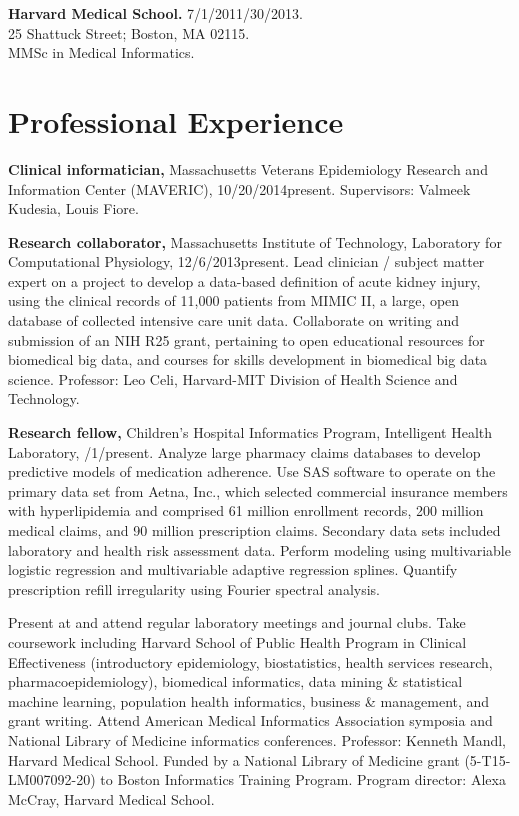 \documentclass[12pt]{article}
\begin{document}
\textbf{Harvard Medical School.} 7/1/2011/30/2013.\\
25 Shattuck Street; Boston, MA 02115.\\
MMSc in Medical Informatics.

\newpage

\section*{Professional Experience} %

\textbf{Clinical informatician,} Massachusetts Veterans Epidemiology
Research and Information Center (MAVERIC), 10/20/2014\ndash{}present.
Supervisors: Valmeek Kudesia, Louis Fiore.

\textbf{Research collaborator,} Massachusetts Institute of Technology,
Laboratory for Computational Physiology, 12/6/2013\ndash{}present.
Lead clinician / subject matter expert on a project to develop a
data-based definition of acute kidney injury, using the clinical
records of 11,000 patients from MIMIC II, a large, open database of
collected intensive care unit data. Collaborate on writing and
submission of an NIH R25 grant, pertaining to open educational
resources for biomedical big data, and courses for skills development
in biomedical big data science. Professor: Leo Celi, Harvard-MIT
Division of Health Science and Technology.

\textbf{Research fellow,} Children’s Hospital Informatics Program,
Intelligent Health Lab\-o\-ra\-to\-ry,
/1/\ndash{}\linebreak[0]pres\-ent.
Analyze large pharmacy claims databases to develop predictive models
of medication adherence. Use SAS software to operate on the primary
data set from Aetna, Inc., which selected commercial insurance members
with hyperlipidemia and comprised 61 million enrollment records, 200
million medical claims, and 90 million prescription claims. Secondary
data sets included laboratory and health risk assessment data. Perform
modeling using multivariable logistic regression and multivariable
adaptive regression splines. Quantify prescription refill irregularity
using Fourier spectral analysis.

Present at and attend regular laboratory meetings and journal clubs.
Take coursework including Harvard School of Public Health Program in
Clinical Effectiveness (introductory epidemiology, biostatistics,
health services research, pharmacoepidemiology), biomedical
informatics, data mining \& statistical machine learning, population
health informatics, business \& management, and grant writing. Attend
American Medical Informatics Association symposia and National Library
of Medicine informatics conferences. Professor: Kenneth Mandl, Harvard
Medical School. Funded by a National Library of Medicine grant
(5-T15-LM007092-20) to Boston Informatics Training Program. Program
director: Alexa McCray, Harvard Medical School.
\end{document}
